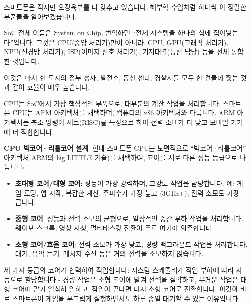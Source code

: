 


스마트폰은 작지만 오장육부를 다 갖추고 있습니다. 해부학 수업처럼 하나씩 이 정밀한 부품들을 알아보겠습니다.


SoC 전체 이름은 System on Chip, 번역하면 “전체 시스템을 하나의 칩에 집어넣는다”입니다. 그것은 CPU(중앙 처리기)만이 아니라, CPU, GPU(그래픽 처리기), NPU(신경망 처리기), ISP(이미지 신호 처리기), 기저대역(통신 담당) 등을 전체 통합한 것입니다.

이것은 마치 한 도시의 정부 청사, 발전소, 통신 센터, 경찰서를 모두 한 건물에 짓는 것과 같아 효율이 매우 높습니다.


CPU는 SoC에서 가장 핵심적인 부품으로, 대부분의 계산 작업을 처리합니다. 스마트폰 CPU는 ARM 아키텍처를 채택하며, 컴퓨터의 x86 아키텍처와 다릅니다. ARM 아키텍처는 축소 명령어 세트(RISC)를 특징으로 하여 전력 소비가 더 낮고 모바일 기기에 더 적합합니다.

\textbf{CPU 빅코어·리틀코어 설계}: 현대 스마트폰 CPU는 보편적으로 “빅코어·리틀코어” 아키텍처(ARM의 big.LITTLE 기술)를 채택하여, 코어를 서로 다른 성능 등급으로 나눕니다:

\begin{itemize}
  \item \textbf{초대형 코어/대형 코어}: 성능이 가장 강력하며, 고강도 작업을 담당합니다. 예: 게임 로딩, 앱 시작, 복잡한 계산. 주파수가 가장 높고 (3GHz+), 전력 소모도 가장 큽니다.
  \item \textbf{중형 코어}: 성능과 전력 소모의 균형으로, 일상적인 중간 부하 작업을 처리합니다. 웨이보 스크롤, 영상 시청, 멀티태스킹 전환이 주로 여기에 의존합니다.
  \item \textbf{소형 코어/효율 코어}: 전력 소모가 가장 낮고, 경량 백그라운드 작업을 처리합니다. 대기, 음악 듣기, 메시지 수신 등은 거의 전력을 소모하지 않습니다.
\end{itemize}

세 가지 등급의 코어가 협력하여 작업합니다: 시스템 스케줄러가 작업 부하에 따라 자동으로 할당합니다 - 경량 작업은 소형 코어에 맡겨 전력을 절약하고, 무거운 작업은 대형 코어에 맡겨 열심히 일하고, 작업이 끝나면 다시 소형 코어로 전환합니다. 이것이 바로 스마트폰이 게임을 부드럽게 실행하면서도 하루 종일 대기할 수 있는 이유입니다.

